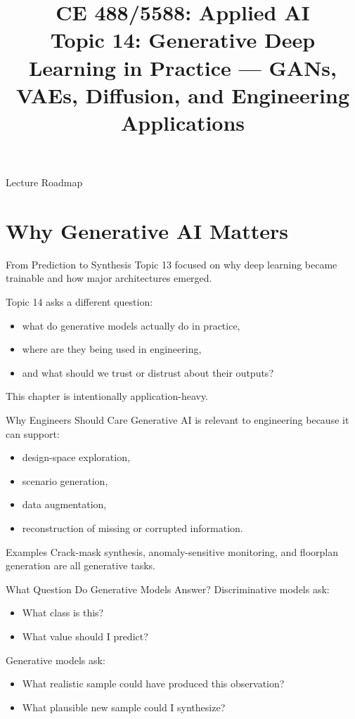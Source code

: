 \documentclass[12pt]{beamer}
\title[Topic 14: Generative Deep Learning]{CE 488/5588: Applied AI\\Topic 14: Generative Deep Learning in Practice --- GANs, VAEs, Diffusion, and Engineering Applications}
\author{}
\date{}
\begin{document}
\begin{frame}
  \titlepage
\end{frame}

\begin{frame}{Lecture Roadmap}
  \tableofcontents
\end{frame}

\section{Why Generative AI Matters}

\begin{frame}{From Prediction to Synthesis}
  Topic 13 focused on why deep learning became trainable and how major architectures emerged.

  Topic 14 asks a different question:
  \begin{itemize}
    \item what do generative models actually do in practice,
    \item where are they being used in engineering,
    \item and what should we trust or distrust about their outputs?
  \end{itemize}

  This chapter is intentionally application-heavy.
\end{frame}

\begin{frame}{Why Engineers Should Care}
  Generative AI is relevant to engineering because it can support:
  \begin{itemize}
    \item design-space exploration,
    \item scenario generation,
    \item data augmentation,
    \item reconstruction of missing or corrupted information.
  \end{itemize}

  \begin{examplebox}{Examples}
    Crack-mask synthesis, anomaly-sensitive monitoring, and floorplan generation are all generative tasks.
  \end{examplebox}
\end{frame}

\begin{frame}{What Question Do Generative Models Answer?}
  Discriminative models ask:
  \begin{itemize}
    \item What class is this?
    \item What value should I predict?
  \end{itemize}

  Generative models ask:
  \begin{itemize}
    \item What realistic sample could have produced this observation?
    \item What plausible new sample could I synthesize?
  \end{itemize}
\end{frame}
\end{document}
